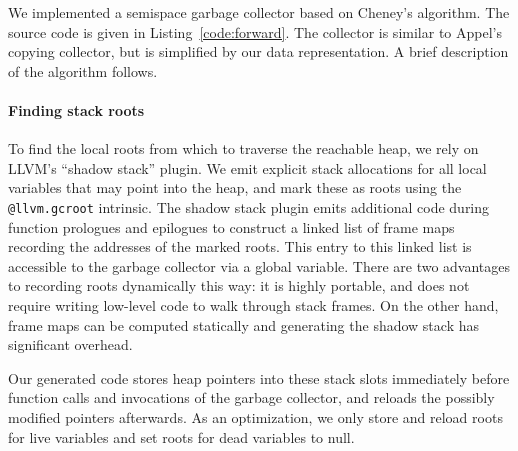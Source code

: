 \documentclass{article}
\begin{document}
We implemented a semispace garbage collector based on Cheney's algorithm. The source code is given in Listing~\ref{code:forward}. The collector is similar to Appel's copying collector, but is simplified by our data representation. A brief description of the algorithm follows.

\paragraph{Finding stack roots} To find the local roots from which to traverse the reachable heap, we rely on LLVM's ``shadow stack'' plugin. We emit explicit stack allocations for all local variables that may point into the heap, and mark these as roots using the \lstinline!@llvm.gcroot! intrinsic. The shadow stack plugin emits additional code during function prologues and epilogues to construct a linked list of frame maps recording the addresses of the marked roots. This entry to this linked list is accessible to the garbage collector via a global variable. There are two advantages to recording roots dynamically this way: it is highly portable, and does not require writing low-level code to walk through stack frames. On the other hand, frame maps can be computed statically and generating the shadow stack has significant overhead.

Our generated code stores heap pointers into these stack slots immediately before function calls and invocations of the garbage collector, and reloads the possibly modified pointers afterwards. As an optimization, we only store and reload roots for live variables and set roots for dead variables to null.
\end{document}
